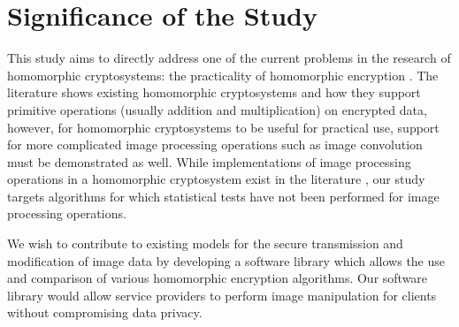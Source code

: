 \section{Significance of the Study}

This study aims to directly address one of the current problems in the research of homomorphic cryptosystems: the practicality of homomorphic encryption \cite{sen_homomorphic_2013}. The literature shows existing homomorphic cryptosystems and how they support primitive operations (usually addition and multiplication) on encrypted data, however, for homomorphic cryptosystems to be useful for practical use, support for more complicated image processing operations such as image convolution must be demonstrated as well. While implementations of image processing operations in a homomorphic cryptosystem exist in the literature \cite{ziad_cryptoimg:_2016, garay_algorithms_2014}, our study targets algorithms for which statistical tests have not been performed for image processing operations.

We wish to contribute to existing models for the secure transmission and modification of image data by developing a software library which allows the use and comparison of various homomorphic encryption algorithms. Our software library would allow service providers to perform image manipulation for clients without compromising data privacy.
